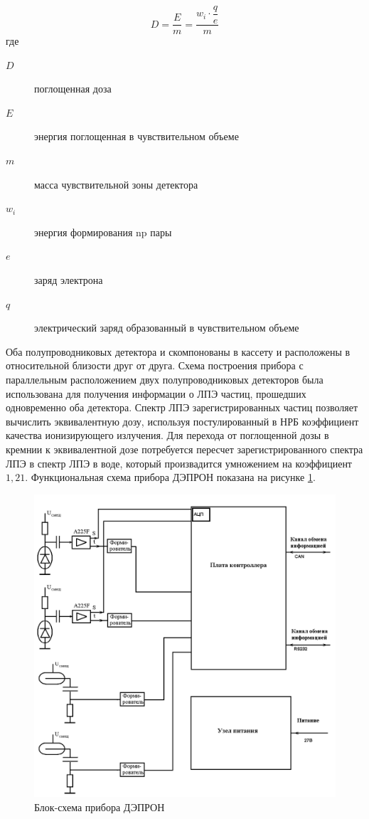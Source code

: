 \begin{equation}\label{eq:benghin_doze}
D = \frac{E}{m} = \dfrac{w_i \cdot\dfrac{q}{e}}{m}
\end{equation}
где \begin{description}
	\item[$ D $] поглощенная доза
	\item[$ E $] энергия поглощенная в чувствительном объеме
	\item[$ m $] масса чувствительной зоны детектора
	\item[$ w_i $] энергия формирования np пары
	\item[$ e $] заряд электрона
	\item[$ q $] электрический заряд образованный в чувствительном объеме
\end{description}
Оба полупроводниковых детектора и скомпонованы в кассету и расположены в относительной близости друг от друга. Схема построения прибора с параллельным расположением двух полупроводниковых детекторов была использована для получения информации о ЛПЭ частиц, прошедших одновременно оба детектора. Спектр ЛПЭ зарегистрированных частиц позволяет вычислить эквивалентную дозу, используя постулированный в НРБ коэффициент качества ионизирующего излучения. Для перехода от поглощенной дозы в кремнии к эквивалентной дозе потребуется пересчет зарегистрированного спектра ЛПЭ в спектр ЛПЭ в воде, который произвадится умножением на коэффициент $ 1,21 $.
 Функциональная схема прибора ДЭПРОН показана на рисунке \ref{fig:Depron_blocksch}.
 
\begin{figure}
\centering
\includegraphics[width=0.8\linewidth]{images/Depron_blocksch}
\caption{Блок-схема прибора ДЭПРОН}
\label{fig:Depron_blocksch}
\end{figure}


